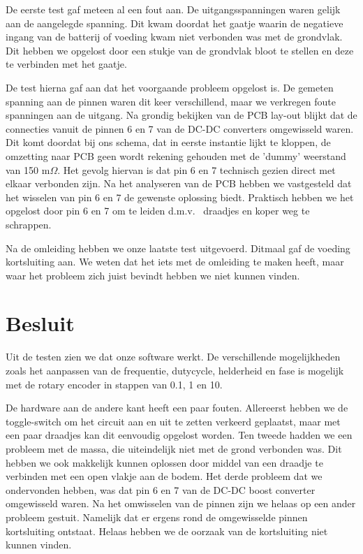 \documentclass[a4paper,dutch]{article}
\begin{document}
De eerste test gaf meteen al een fout aan. De uitgangsspanningen waren gelijk aan de aangelegde spanning. Dit kwam doordat het gaatje waarin de negatieve ingang van de batterij of voeding  kwam niet verbonden was met de grondvlak. Dit hebben we opgelost door een stukje van de grondvlak bloot te stellen en deze te verbinden met het gaatje.

De test hierna gaf aan dat het voorgaande probleem opgelost is.
De gemeten spanning aan de pinnen waren dit keer verschillend, maar we verkregen foute spanningen aan de uitgang. Na grondig bekijken van de PCB lay-out blijkt dat de connecties vanuit de pinnen 6 en 7 van de DC-DC converters omgewisseld waren. Dit komt doordat bij ons schema, dat in eerste instantie lijkt te kloppen, de omzetting naar PCB geen wordt rekening gehouden met de 'dummy' weerstand van 150 m$\Omega$. Het gevolg hiervan is dat pin 6 en 7 technisch gezien direct met elkaar verbonden zijn. Na het analyseren van de PCB hebben we vastgesteld dat het wisselen van pin 6 en 7 de gewenste oplossing biedt. Praktisch hebben we het opgelost door pin 6 en 7 om te leiden d.m.v. \ draadjes en koper weg te schrappen. 

Na de omleiding hebben we onze laatste test uitgevoerd. Ditmaal gaf de voeding kortsluiting  aan. We weten dat het iets met de omleiding te maken heeft, maar waar het probleem zich juist bevindt hebben we niet kunnen vinden.



\section{Besluit}
Uit de testen zien we dat onze software werkt. De verschillende mogelijkheden zoals het aanpassen van de frequentie, dutycycle, helderheid en fase is mogelijk met de rotary encoder in stappen van 0.1, 1 en 10.

De hardware aan de andere kant heeft een paar fouten. Allereerst hebben we de toggle-switch om het circuit aan en uit te zetten verkeerd geplaatst, maar met een paar draadjes kan dit eenvoudig opgelost worden. Ten tweede hadden we een probleem met de massa, die uiteindelijk niet met de grond verbonden was. Dit hebben we ook makkelijk kunnen oplossen door middel van een draadje te verbinden met een open vlakje aan de bodem. Het derde probleem dat we ondervonden hebben, was dat pin 6 en 7 van de DC-DC boost converter omgewisseld waren. Na het omwisselen van de pinnen zijn we helaas op een ander probleem gestuit. Namelijk dat er ergens rond de omgewisselde pinnen kortsluiting ontstaat. Helaas hebben we de oorzaak van de kortsluiting niet kunnen vinden.
\end{document}
